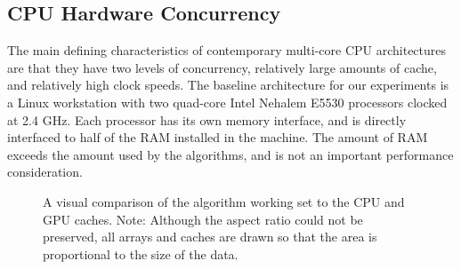 \documentclass[preprint]{sigplanconf}
\begin{document}
\subsection{CPU Hardware Concurrency}
\vspace{-0.06in}
\label{sec:CPU-concurrency}
The main defining characteristics of contemporary multi-core CPU architectures
are that they have two levels of concurrency, relatively large amounts of
cache, and relatively high clock speeds. The baseline architecture for our experiments 
is a Linux workstation with two
quad-core Intel Nehalem E5530 processors clocked at 2.4 GHz.  Each processor
has its own memory interface, and is directly interfaced to half of the RAM
installed in the machine.  The amount of RAM exceeds the amount used
by the algorithms, and is not an important performance consideration.  

\begin{figure}
\centering
{}
\label{fig:caches}
\caption{A visual comparison of the algorithm working set to the CPU and GPU
caches.  Note: Although the aspect ratio could not be preserved, all arrays and
caches are drawn so that the area is proportional to the size of the data. } \vspace{-0.1in}
\end{figure}
\end{document}
